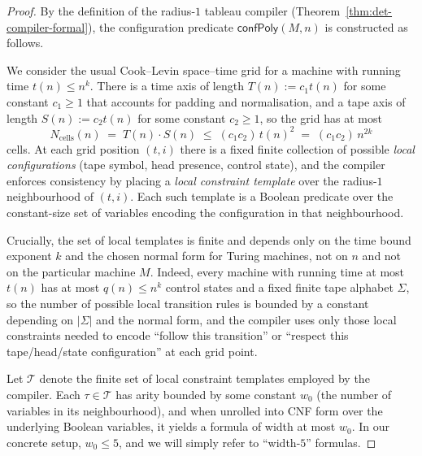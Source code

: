 \documentclass[12pt]{article}
\theoremstyle{definition}
\theoremstyle{definition}
\theoremstyle{remark}
\theoremstyle{remark}
\begin{document}
\begin{proof}
By the definition of the radius-$1$ tableau compiler
(Theorem~\ref{thm:det-compiler-formal}), the configuration predicate
$\mathsf{confPoly}(M,n)$ is constructed as follows.

We consider the usual Cook--Levin space--time grid for a machine with
running time $t(n) \le n^k$. There is a time axis of length
$T(n) := c_1 t(n)$ for some constant $c_1 \ge 1$ that accounts for
padding and normalisation, and a tape axis of length $S(n) := c_2 t(n)$
for some constant $c_2 \ge 1$, so the grid has at most
\[
   N_{\mathrm{cells}}(n) \;=\; T(n)\cdot S(n) \;\le\; (c_1 c_2)\, t(n)^2
   \;=\; (c_1 c_2)\, n^{2k}
\]
cells. At each grid position $(t,i)$ there is a fixed finite collection
of possible \emph{local configurations} (tape symbol, head presence,
control state), and the compiler enforces consistency by placing a
\emph{local constraint template} over the radius-$1$ neighbourhood of
$(t,i)$. Each such template is a Boolean predicate over the constant-size
set of variables encoding the configuration in that neighbourhood.

Crucially, the set of local templates is finite and depends only on the
time bound exponent $k$ and the chosen normal form for Turing machines,
not on $n$ and not on the particular machine $M$. Indeed, every machine
with running time at most $t(n)$ has at most $q(n) \le n^k$ control
states and a fixed finite tape alphabet $\Sigma$, so the number of
possible local transition rules is bounded by a constant depending on
$|\Sigma|$ and the normal form, and the compiler uses only those local
constraints needed to encode ``follow this transition'' or ``respect
this tape/head/state configuration'' at each grid point.

Let $\mathcal{T}$ denote the finite set of local constraint templates
employed by the compiler. Each $\tau \in \mathcal{T}$ has arity bounded
by some constant $w_0$ (the number of variables in its neighbourhood),
and when unrolled into CNF form over the underlying Boolean
variables, it yields a formula of width at most $w_0$. In our concrete
setup, $w_0 \le 5$, and we will simply refer to ``width-$5$'' formulas.


\end{proof}
\end{document}
